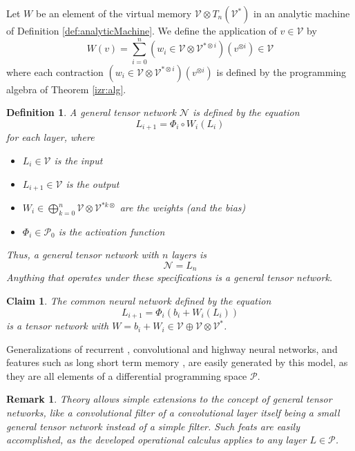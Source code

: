 \documentclass[preprint,12pt]{elsarticle}
\newcommand{\VV}{\mathcal{V}}
\newcommand{\NN}{\mathcal{N}}
\newcommand{\dP}{\mathcal{P}}
\newtheorem{definicija}{Definition}[section]
\newtheorem{trditev}{Claim}[section]
\newtheorem{opomba}{Remark}[section]
\begin{document}
Let $W$ be an element of the virtual memory $\VV\otimes T_n(\VV^*)$ in an analytic machine of Definition \ref{def:analyticMachine}. We define the application of $v\in \VV$ by
\begin{equation}
W(v)=\sum\limits_{i=0}^n(w_i\in \VV\otimes \VV^{*\otimes i})(v^{\otimes i})\in \VV
\end{equation}
where each contraction $(w_i\in \VV\otimes \VV^{*\otimes i})(v^{\otimes i})$ is defined by the programming algebra of Theorem \ref{izr:alg}.

\begin{definicija}
A general tensor network $\NN$ is defined by the equation
\begin{equation}
L_{i+1}=\Phi_i\circ W_i(L_i)
\end{equation}
for each layer, where
\begin{itemize}
\item
$L_i\in \VV$ is the input
\item
$L_{i+1}\in \VV$ is the output
\item
$W_i\in \bigoplus\limits_{k=0}^n\VV\otimes \VV^{*k\otimes}$ are the weights (and the bias)
\item
$\Phi_i\in\dP_0$ is the activation function
\end{itemize}
Thus, a general tensor network with $n$ layers is
\begin{equation}
\NN=L_n
\end{equation}
Anything that operates under these specifications is a general tensor network.
\end{definicija}

\begin{trditev}
The common neural network defined by the equation
$$L_{i+1}=\Phi_i(b_i+W_i(L_i))$$
is a tensor network with $W=b_i+W_i\in \VV\oplus \VV\otimes \VV^*$.
\end{trditev}

Generalizations of recurrent \cite{RecurrentNet}, convolutional \cite{ConvNet} and highway  \cite{HighwayNet} neural networks, and features such as long short term memory \cite{LSTM}, are easily generated by this model, as they are all elements of a differential programming space $\dP$.

\begin{opomba}
Theory allows simple extensions to the concept of general tensor networks, like a convolutional filter of a convolutional layer itself being a small general tensor network instead of a simple filter. Such feats are easily accomplished, as the developed operational calculus applies to any layer $L\in\dP$. 
\end{opomba}
\end{document}
